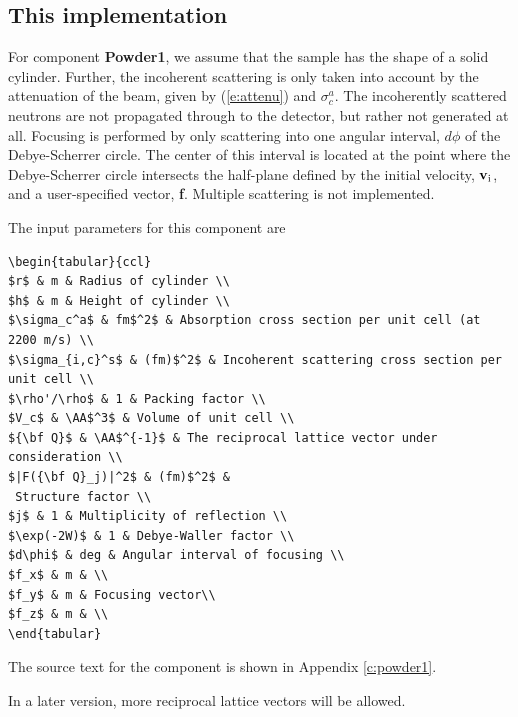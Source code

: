 \subsection{This implementation}
For component {\bf Powder1}, we assume that the sample
has the shape of a solid cylinder.
Further, the incoherent scattering is only taken into account
by the attenuation of the beam, given by (\ref{e:attenu})
and $\sigma_c^a$.
The incoherently scattered neutrons are not
propagated through to the detector, but rather not generated at all.
Focusing is performed by only scattering into one angular
interval, $d\phi$ of the Debye-Scherrer circle. The center of this
interval is located at the point where the Debye-Scherrer circle
intersects the half-plane defined by the initial velocity, ${\bf v}_{\rm i}$,
and a user-specified vector, {\bf f}.
Multiple scattering is not implemented.

The input parameters for this component are
%
\begin{lstlisting}\begin{tabular}{ccl}
$r$ & m & Radius of cylinder \\
$h$ & m & Height of cylinder \\
$\sigma_c^a$ & fm$^2$ & Absorption cross section per unit cell (at 2200 m/s) \\
$\sigma_{i,c}^s$ & (fm)$^2$ & Incoherent scattering cross section per unit cell \\
$\rho'/\rho$ & 1 & Packing factor \\
$V_c$ & \AA$^3$ & Volume of unit cell \\
${\bf Q}$ & \AA$^{-1}$ & The reciprocal lattice vector under consideration \\
$|F({\bf Q}_j)|^2$ & (fm)$^2$ &
 Structure factor \\
$j$ & 1 & Multiplicity of reflection \\
$\exp(-2W)$ & 1 & Debye-Waller factor \\
$d\phi$ & deg & Angular interval of focusing \\
$f_x$ & m & \\
$f_y$ & m & Focusing vector\\
$f_z$ & m & \\
\end{tabular}\end{lstlisting}
%
The source text for the component is shown in Appendix
\ref{c:powder1}.

In a later version, more reciprocal lattice vectors will be
allowed.

